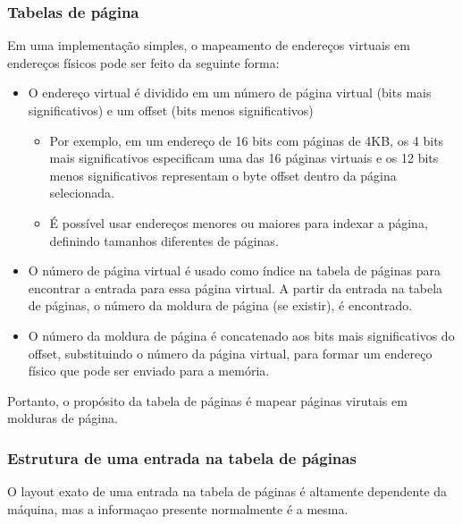 \documentclass[10pt]{article}
\begin{document}
\subsubsection{Tabelas de página}
\par Em uma implementação simples, o mapeamento de endereços virtuais em endereços físicos 
pode ser feito da seguinte forma:
\begin{itemize}
    \item O endereço virtual é dividido em um número de página virtual (bits mais 
        significativos) e um offset (bits menos significativos)
        \begin{itemize}
            \item Por exemplo, em um endereço de 16 bits com páginas de 4KB,
                os 4 bits mais significativos especificam uma das 16 páginas virtuais
                e os 12 bits menos significativos representam o byte offset dentro
                da página selecionada.
            \item É possível usar endereços menores ou maiores para indexar a página,
                definindo tamanhos diferentes de páginas.
        \end{itemize}
    \item O número de página virtual é usado como índice na tabela de páginas para 
        encontrar a entrada para essa página virtual. A partir da entrada na tabela
        de páginas, o número da moldura de página (se existir), é encontrado.
    \item O número da moldura de página é concatenado aos bits mais significativos
    do offset, substituindo o número da página virtual, para formar um endereço
    físico que pode ser enviado para a memória.
\end{itemize}
\par Portanto, o propósito da tabela de páginas é mapear páginas virutais em molduras
de página. 

\subsubsection{Estrutura de uma entrada na tabela de páginas}

\par 
\indent O layout exato de uma entrada na tabela de páginas é altamente dependente da
máquina, mas a informaçao presente normalmente é a mesma.
\end{document}
